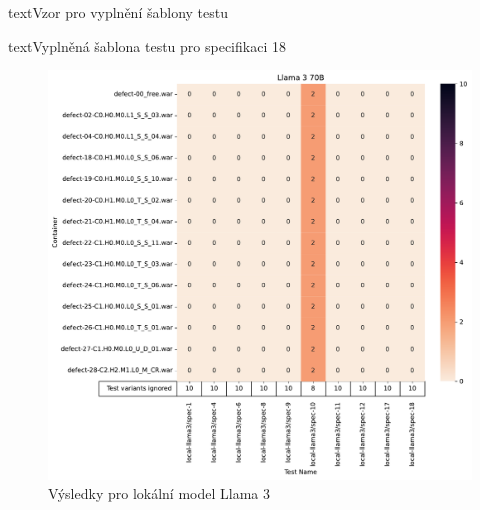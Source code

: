 \documentclass[czech, ma, kiv, he, iso690numb, pdf, viewonly]{fasthesis}
\begin{document}
\begin{code}{text}{Vzor pro vyplnění šablony testu \label{lst:template}}
{\begin{code}{text}{Vyplněná šablona testu pro specifikaci 18 \label{lst:spec18}}
{            \begin{figure}[H]
                \includegraphics[width=\textwidth]{pic/llama-3-results.pdf}
                \caption{Výsledky pro lokální model Llama 3}
                \label{fig:res:llama3}
            \end{figure}

}
\end{code}}
\end{code}
\end{document}
